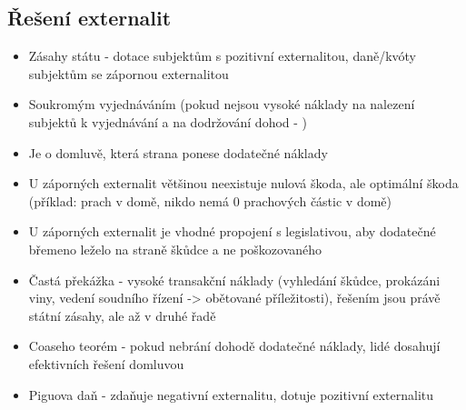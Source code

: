 \subsection{Řešení externalit}
\begin{itemize}
    \item Zásahy státu - dotace subjektům s pozitivní externalitou, daně/kvóty subjektům se zápornou externalitou
    \item Soukromým vyjednáváním (pokud nejsou vysoké náklady na nalezení subjektů k vyjednávání a na dodržování
    dohod - )
    \item Je o domluvě, která strana ponese dodatečné náklady
    \item U záporných externalit většinou neexistuje nulová škoda, ale optimální škoda (příklad: prach v domě, nikdo
    nemá 0 prachových částic v domě)
    \item U záporných externalit je vhodné propojení s legislativou, aby dodatečné břemeno leželo na straně škůdce a ne
    poškozovaného
    \item Častá překážka - vysoké transakční náklady (vyhledání škůdce, prokázáni viny, vedení soudního řízení ->
    obětované příležitosti), řešením jsou právě státní zásahy, ale až v druhé řadě
    \item Coaseho teorém - pokud nebrání dohodě dodatečné náklady, lidé dosahují efektivních řešení domluvou
    \item Piguova daň - zdaňuje negativní externalitu, dotuje pozitivní externalitu
\end{itemize}